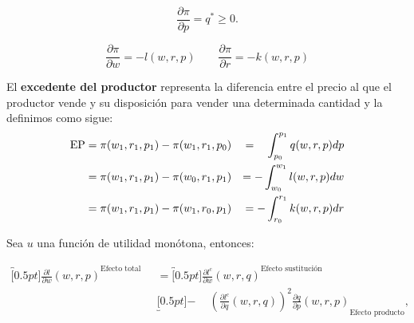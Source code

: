 \documentclass[8pt,a4paper]{extarticle}
\begin{document}
\begin{multicols}{3}
	\begin{boxlemma}
		\[
			\frac{\partial \pi}{\partial p} = q^* \ge 0
			.\]
	\end{boxlemma}

	\begin{boxcor}
		\[
			\frac{\partial \pi}{\partial w} = - l (w, r, p) \qquad \frac{\partial \pi}{\partial r} = - k (w, r, p)
		\]
	\end{boxcor}

	\begin{boxdef}
		El \textbf{excedente del productor} representa la diferencia entre el precio al que el productor vende y su disposición para vender una determinada cantidad y la definimos como sigue:
		\begin{equation*}
			\begin{aligned}
				\text{\normalfont EP} & = \pi(w_1, r_1, p_1) - \pi(w_1, r_1, p_0) & = \phantom{-} \int_{p_0}^{p_1} q(w,r,p)dp \\
				                      & = \pi(w_1, r_1, p_1) - \pi(w_0, r_1, p_1) & = - \int_{w_0}^{w_1} l(w,r,p)dw           \\
				                      & = \pi(w_1, r_1, p_1) - \pi(w_1, r_0, p_1) & = - \int_{r_0}^{r_1} k(w,r,p)dr
			\end{aligned}
		\end{equation*}
	\end{boxdef}

	\newpage

	\sectionbreak

	\begin{boxtheo}
		Sea $u$ una función de utilidad monótona, entonces:

		\begin{equation*}
			\begin{aligned}
				\overbracket[0.5pt]{\frac{\partial l}{\partial w} (w, r, p)}^{\text{Efecto total}} \quad & = \overbracket[0.5pt]{\frac{\partial l^c}{\partial w} (w, r, q)}^{\text{Efecto sustitución}}                                                               \\
				                                                                                         & \underbracket[0.5pt]{ - \quad\ \left( \frac{\partial l^c}{\partial q} (w,r,q) \right)^2 \frac{\partial q}{\partial p} (w, r, p)}_{\text{Efecto producto}},
			\end{aligned}
		\end{equation*}


\end{boxtheo}
\end{multicols}
\end{document}
